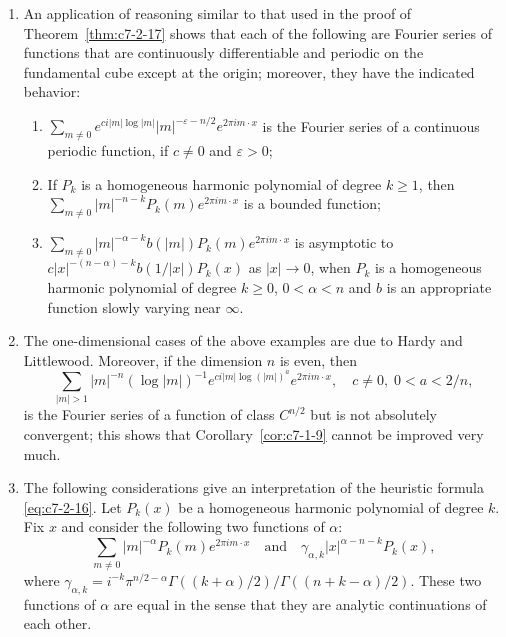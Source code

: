 \begin{enumerate}
\item[6.1.] An application of reasoning similar to that used in the proof of Theorem~\ref{thm:c7-2-17} shows that each of the following are Fourier series of functions that are continuously differentiable and periodic on the fundamental cube except at the origin; moreover, they have the indicated behavior:
\begin{enumerate}
\item[(a)] $\sum_{m \neq 0} e^{ci|m| \log |m|} |m|^{-\varepsilon - n/2} e^{2\pi i m \cdot x}$ is the Fourier series of a continuous periodic function, if $c \neq 0$ and $\varepsilon > 0$;
\item[(b)] If $P_k$ is a homogeneous harmonic polynomial of degree $k \geq 1$, then $\sum_{m \neq 0} |m|^{-n-k} P_k(m) e^{2\pi i m \cdot x}$ is a bounded function;
\item[(c)] $\sum_{m \neq 0} |m|^{-\alpha - k} b(|m|) P_k(m) e^{2\pi i m \cdot x}$ is asymptotic to $c|x|^{-(n-\alpha)-k} b(1/|x|) P_k(x)$ as $|x| \to 0$, when $P_k$ is a homogeneous harmonic polynomial of degree $k \geq 0$, $0 < \alpha < n$ and $b$ is an appropriate function slowly varying near $\infty$.
\end{enumerate}

\item[6.2.] The one-dimensional cases of the above examples are due to Hardy and Littlewood. Moreover, if the dimension $n$ is even, then
\[
\sum_{|m| > 1} |m|^{-n} (\log |m|)^{-1} e^{ci|m| \log(|m|)^a} e^{2\pi i m \cdot x}, \quad c \neq 0, \; 0 < a < 2/n,
\]
is the Fourier series of a function of class $C^{n/2}$ but is not absolutely convergent; this shows that Corollary~\ref{cor:c7-1-9} cannot be improved very much.

\item[6.3.] The following considerations give an interpretation of the heuristic formula \eqref{eq:c7-2-16}. Let $P_k(x)$ be a homogeneous harmonic polynomial of degree $k$. Fix $x$ and consider the following two functions of $\alpha$:
\[
\sum_{m \neq 0} |m|^{-\alpha} P_k(m) e^{2\pi i m \cdot x} \quad \text{and} \quad \gamma_{\alpha,k} |x|^{\alpha - n - k} P_k(x),
\]
where $\gamma_{\alpha,k} = i^{-k} \pi^{n/2 - \alpha} \Gamma((k + \alpha)/2) / \Gamma((n + k - \alpha)/2)$. These two functions of $\alpha$ are equal in the sense that they are analytic continuations of each other.


\end{enumerate}
